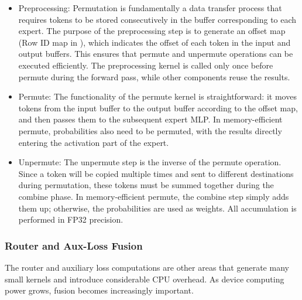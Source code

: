 \begin{itemize}
    \item Preprocessing: Permutation is fundamentally a data transfer process that requires tokens to be stored consecutively in the buffer corresponding to each expert. The purpose of the preprocessing step is to generate an offset map (Row ID map in ), which indicates the offset of each token in the input and output buffers. This ensures that permute and unpermute operations can be executed efficiently. The preprocessing kernel is called only once before permute during the forward pass, while other components reuse the results.
    \item Permute: The functionality of the permute kernel is straightforward: it moves tokens from the input buffer to the output buffer according to the offset map, and then passes them to the subsequent expert MLP. In memory-efficient permute, probabilities also need to be permuted, with the results directly entering the activation part of the expert.
    \item Unpermute: The unpermute step is the inverse of the permute operation. Since a token will be copied multiple times and sent to different destinations during permutation, these tokens must be summed together during the combine phase. In memory-efficient permute, the combine step simply adds them up; otherwise, the probabilities are used as weights. All accumulation is performed in FP32 precision.
\end{itemize}

\subsubsection{Router and Aux-Loss Fusion}

The router and auxiliary loss \cite{fedus2022switchtransformersscalingtrillion,zoph2022stmoe,hwang2023tutel,rajbhandari2022deepspeedmoe} computations are other areas that generate many small kernels and introduce considerable CPU overhead. As device computing power grows, fusion becomes increasingly important.

